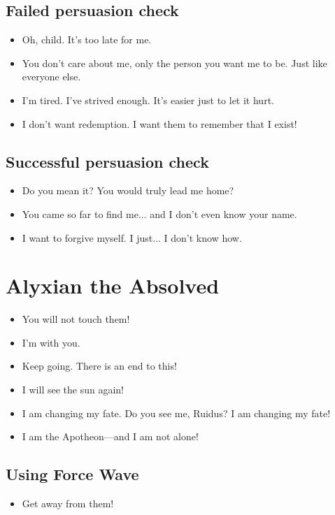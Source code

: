 \documentclass[10pt,a4paper,bg=print,twocolumn,openany,nodeprecatedcode]{dndarticle}
\begin{document}
\subsection*{Failed persuasion check}
\begin{itemize}
  \item Oh, child. It's too late for me.
  \item You don't care about me, only the person you want me to be. Just like everyone else.
  \item I'm tired. I've strived enough. It's easier just to let it hurt.
  \item I don't want redemption. I want them to remember that I exist!
\end{itemize}

\subsection*{Successful persuasion check}
\begin{itemize}
  \item Do you mean it? You would truly lead me home?
  \item You came so far to find me... and I don't even know your name.
  \item I want to forgive myself. I just... I don't know how.
\end{itemize}

\section*{Alyxian the Absolved}

\begin{itemize}
  \item You will not touch them!
  \item I'm with you.
  \item Keep going. There is an end to this!
  \item I will see the sun again!
  \item I am changing my fate. Do you see me, Ruidus? I am changing my fate!
  \item I am the Apotheon—and I am not alone!
\end{itemize}

\subsection*{Using Force Wave}
\begin{itemize}
  \item Get away from them!
\end{itemize}
\end{document}
